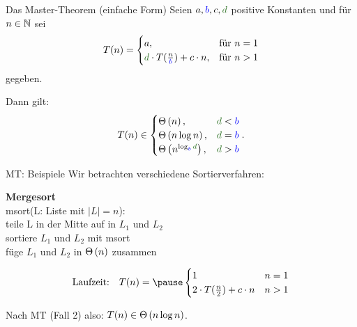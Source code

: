 \begin{frame}{Das Master-Theorem (einfache Form)}  %
	Seien $a, \textcolor{blue}{b}, c, \textcolor{darkgreen}{d}$ positive Konstanten und für $n \in \mathbb{N}$ sei 
	\[
	T(n) = 
	\begin{cases}
	a,  & \text{für } n = 1 \\
	\textcolor{darkgreen}{d} \cdot T\large(\frac{n}{\textcolor{blue}{b}}\large) + c\·n, & \text{für } n > 1
	\end{cases}
	\]
	gegeben. \\ \smallskip
	
	Dann gilt:
	\[
	T(n) \in 
	\begin{cases}
	\Th{n},                                                        & \textcolor{darkgreen}{d} < \textcolor{blue}{b} \\
	\Th{n \log n},                                                 & \textcolor{darkgreen}{d} = \textcolor{blue}{b} \\
	\Th{n^{\log _{\textcolor{blue}{b}} \textcolor{darkgreen}{d}}}, & \textcolor{darkgreen}{d} > \textcolor{blue}{b}
	\end{cases}.
	\]
\end{frame}

\begin{frame}[t]{MT: Beispiele}
	Wir betrachten verschiedene Sortierverfahren:\\
	\bigskip
	
	\textbf{Mergesort}\\
	msort(L: Liste mit $|L| = n$):\\
	\quad	teile L in der Mitte auf in $L_1$ und $L_2$\\
	\quad	sortiere $L_1$ und $L_2$ mit msort \\
	\quad 	füge $L_1$ und $L_2$ in $\Theta\left(n\right)$ zusammen\\
	\medskip
	
	$$\text{Laufzeit:} \quad T(n) = \pause \begin{cases}
	1 & n = 1\\
	2 \cdot T(\fract n/2 ) + c \cdot n & n > 1
	\end{cases}$$
	
	\pause
	Nach MT (Fall 2) also: $T(n) \in \Theta\left(n \log n\right)$.
\end{frame}

